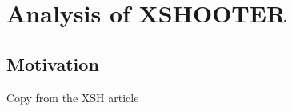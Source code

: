 

\chapter{Analysis of XSHOOTER} %
\label{chap:seds}


\section{Motivation}
Copy from the XSH article


